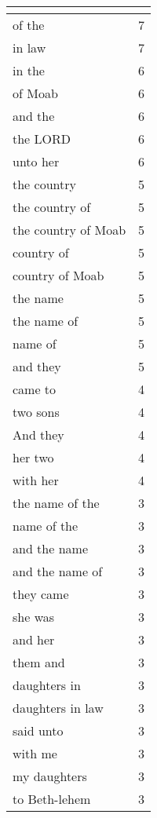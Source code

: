 \begin{center}
\begin{longtable}{|p{3.0in}|p{0.5in}|}
\hline \multicolumn{2}{c}{{ }} \\ \hline
\endfoot 
of the & 7\\ \hline 
in law & 7\\ \hline 
in the & 6\\ \hline 
of Moab & 6\\ \hline 
and the & 6\\ \hline 
the LORD & 6\\ \hline 
unto her & 6\\ \hline 
the country & 5\\ \hline 
the country of & 5\\ \hline 
the country of Moab & 5\\ \hline 
country of & 5\\ \hline 
country of Moab & 5\\ \hline 
the name & 5\\ \hline 
the name of & 5\\ \hline 
name of & 5\\ \hline 
and they & 5\\ \hline 
came to & 4\\ \hline 
two sons & 4\\ \hline 
And they & 4\\ \hline 
her two & 4\\ \hline 
with her & 4\\ \hline 
the name of the & 3\\ \hline 
name of the & 3\\ \hline 
and the name & 3\\ \hline 
and the name of & 3\\ \hline 
they came & 3\\ \hline 
she was & 3\\ \hline 
and her & 3\\ \hline 
them and & 3\\ \hline 
daughters in & 3\\ \hline 
daughters in law & 3\\ \hline 
said unto & 3\\ \hline 
with me & 3\\ \hline 
my daughters & 3\\ \hline 
to Beth-lehem & 3\\ \hline 
\end{longtable}
\end{center}






